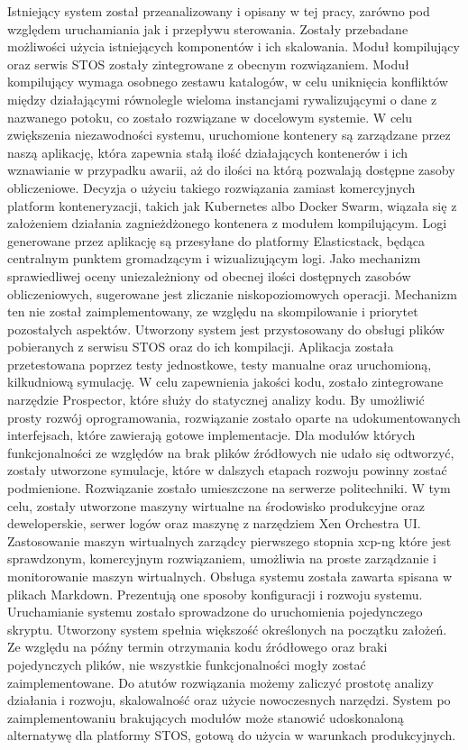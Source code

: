 Istniejący system został przeanalizowany i opisany w tej pracy, zarówno pod względem uruchamiania jak i przepływu sterowania. Zostały przebadane możliwości użycia istniejących komponentów i ich skalowania. Moduł kompilujący oraz serwis STOS zostały zintegrowane z obecnym rozwiązaniem. Moduł kompilujący wymaga osobnego zestawu katalogów, w celu uniknięcia konfliktów między działającymi równolegle wieloma instancjami rywalizującymi o dane z nazwanego potoku, co zostało rozwiązane w docelowym systemie. 
\newline \indent W celu zwiększenia niezawodności systemu, uruchomione kontenery są zarządzane przez naszą aplikację, która zapewnia stałą ilość działających kontenerów i ich wznawianie w przypadku awarii, aż do ilości na którą pozwalają dostępne zasoby obliczeniowe. Decyzja o użyciu takiego rozwiązania zamiast komercyjnych platform konteneryzacji, takich jak Kubernetes albo Docker Swarm, wiązała się z założeniem działania zagnieżdżonego kontenera z modułem kompilującym. Logi generowane przez aplikację są przesyłane do platformy Elasticstack, będąca centralnym punktem gromadzącym i wizualizującym logi. Jako mechanizm sprawiedliwej oceny uniezależniony od obecnej ilości dostępnych zasobów obliczeniowych, sugerowane jest zliczanie niskopoziomowych operacji. Mechanizm ten nie został zaimplementowany, ze względu na skompilowanie i priorytet pozostałych aspektów.
\newline \indent Utworzony system jest przystosowany do obsługi plików pobieranych z serwisu STOS oraz do ich kompilacji. Aplikacja została przetestowana poprzez testy jednostkowe, testy manualne oraz uruchomioną, kilkudniową symulację. W celu zapewnienia jakości kodu, zostało zintegrowane narzędzie Prospector, które służy do statycznej analizy kodu. By umożliwić prosty rozwój oprogramowania, rozwiązanie zostało oparte na udokumentowanych interfejsach, które zawierają gotowe implementacje. Dla modułów których funkcjonalności ze względów na brak plików źródłowych nie udało się odtworzyć, zostały utworzone symulacje, które w dalszych etapach rozwoju powinny zostać podmienione.
\newline \indent Rozwiązanie zostało umieszczone na serwerze politechniki. W tym celu, zostały utworzone maszyny wirtualne na środowisko produkcyjne oraz deweloperskie, serwer logów oraz maszynę z narzędziem Xen Orchestra UI. Zastosowanie maszyn wirtualnych zarządcy pierwszego stopnia xcp-ng które jest sprawdzonym, komercyjnym rozwiązaniem, umożliwia na proste zarządzanie i monitorowanie maszyn wirtualnych.
\newline \indent Obsługa systemu została zawarta spisana w plikach Markdown. Prezentują one sposoby konfiguracji i rozwoju systemu. Uruchamianie systemu zostało sprowadzone do uruchomienia pojedynczego skryptu.
\newline \indent Utworzony system spełnia większość określonych na początku założeń. Ze względu na późny termin otrzymania kodu źródłowego oraz braki pojedynczych plików, nie wszystkie funkcjonalności mogły zostać zaimplementowane. Do atutów rozwiązania możemy zaliczyć prostotę analizy działania i rozwoju, skalowalność oraz użycie nowoczesnych narzędzi. System po zaimplementowaniu brakujących modułów może stanowić udoskonaloną alternatywę dla platformy STOS, gotową do użycia w warunkach produkcyjnych.

